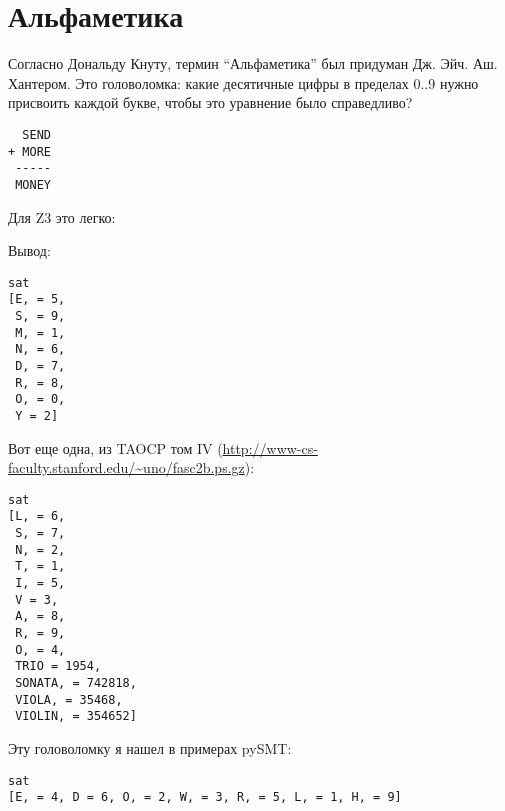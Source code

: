 \section{Альфаметика}

Согласно Дональду Кнуту, термин ``Альфаметика'' был придуман Дж. Эйч. Аш. Хантером.
Это головоломка: какие десятичные цифры в пределах 0..9 нужно присвоить каждой букве, чтобы это уравнение было справедливо?

\begin{lstlisting}
  SEND
+ MORE
 -----
 MONEY
\end{lstlisting}

Для Z3 это легко:



Вывод:

\begin{lstlisting}
sat
[E, = 5,
 S, = 9,
 M, = 1,
 N, = 6,
 D, = 7,
 R, = 8,
 O, = 0,
 Y = 2]
\end{lstlisting}

Вот еще одна, из \ac{TAOCP} том IV (\url{http://www-cs-faculty.stanford.edu/~uno/fasc2b.ps.gz}):



\begin{lstlisting}
sat
[L, = 6,
 S, = 7,
 N, = 2,
 T, = 1,
 I, = 5,
 V = 3,
 A, = 8,
 R, = 9,
 O, = 4,
 TRIO = 1954,
 SONATA, = 742818,
 VIOLA, = 35468,
 VIOLIN, = 354652]
\end{lstlisting}

Эту головоломку я нашел в примерах pySMT:



\begin{lstlisting}
sat
[E, = 4, D = 6, O, = 2, W, = 3, R, = 5, L, = 1, H, = 9]
\end{lstlisting}


